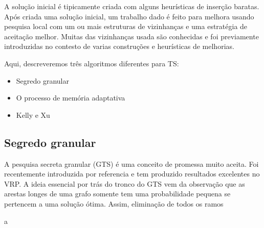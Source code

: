 \documentclass[a4paper, 12pt]{article}
\begin{document}
 A solução inicial é tipicamente criada com alguns heurísticas de inserção baratas. Após criada uma
solução inicial, um trabalho dado é feito para melhora usando pesquisa local com um ou mais
estruturas de vizinhanças e uma estratégia de aceitação melhor. Muitas das vizinhanças usada são
conhecidas e foi previamente introduzidas no contesto de varias construções e heurísticas de
melhorias.

 Aqui, descreveremos três algoritmos diferentes para TS:

\begin{itemize}
\item Segredo granular
\item O processo de memória adaptativa
\item Kelly e Xu
\end{itemize} 

\subsection{Segredo granular}

 A pesquisa secreta granular (GTS) é uma conceito de promessa muito aceita. Foi recentemente
introduzida por {\color{red} referencia} e tem produzido resultados excelentes no VRP. A ideia
essencial por trás do tronco do GTS vem da observação que as arestas longes de uma grafo somente tem
uma probabilidade pequena se pertencem a uma solução ótima. Assim, eliminação de todos os ramos 


a
\end{document}
